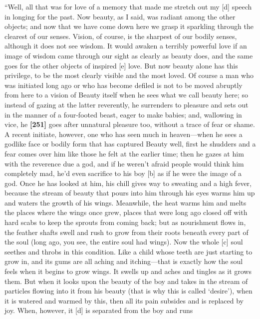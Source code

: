 “Well, all that was for love of a memory that made me stretch out my
{[}d{]} speech in longing for the past. Now beauty, as I said, was
radiant among the other objects; and now that we have come down here we
grasp it sparkling through the clearest of our senses. Vision, of
course, is the sharpest of our bodily senses, although it does not see
wisdom. It would awaken a terribly powerful love if an image of wisdom
came through our sight as clearly as beauty does, and the same goes for
the other objects of inspired {[}e{]} love. But now beauty alone has
this privilege, to be the most clearly visible and the most loved. Of
course a man who was initiated long ago or who has become defiled is not
to be moved abruptly from here to a vision of Beauty itself when he sees
what we call beauty here; so instead of gazing at the latter reverently,
he surrenders to pleasure and sets out in the manner of a four-footed
beast, eager to make babies; and, wallowing in vice, he {\bf {[}251{]}}
goes after unnatural pleasure too, without a trace of fear or shame. A
recent initiate, however, one who has seen much in heaven---when he sees
a godlike face or bodily form that has captured Beauty well, first he
shudders and a fear comes over him like those he felt at the earlier
time; then he gazes at him with the reverence due a god, and if he
weren't afraid people would think him completely mad, he'd even
sacrifice to his boy {[}b{]} as if he were the image of a god. Once he
has looked at him, his chill gives way to sweating and a high fever,
because the stream of beauty that pours into him through his eyes warms
him up and waters the growth of his wings. Meanwhile, the heat warms him
and melts the places where the wings once grew, places that were long
ago closed off with hard scabs to keep the sprouts from coming back; but
as nourishment flows in, the feather shafts swell and rush to grow from
their roots beneath every part of the soul (long ago, you see, the
entire soul had wings). Now the whole {[}c{]} soul seethes and throbs in
this condition. Like a child whose teeth are just starting to grow in,
and its gums are all aching and itching---that is exactly how the soul
feels when it begins to grow wings. It swells up and aches and tingles
as it grows them. But when it looks upon the beauty of the boy and takes
in the stream of particles flowing into it from his beauty (that is why
this is called
‘desire'), when it is
watered and warmed by this, then all its pain subsides and is replaced
by joy. When, however, it {[}d{]} is separated from the boy and runs
